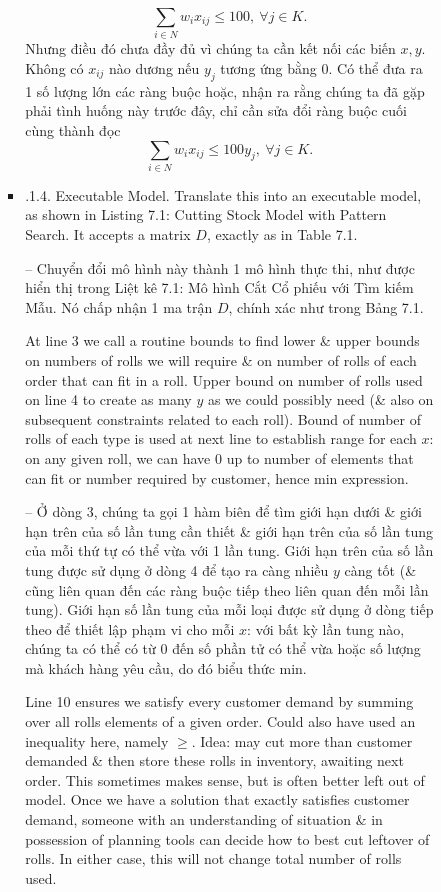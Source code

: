 \documentclass{article}
\begin{document}
\begin{itemize}
\begin{itemize}
\begin{itemize}
\begin{itemize}
\begin{equation*}
                    \sum_{i\in N} w_ix_{ij}\le100,\ \forall j\in K.
                \end{equation*}
                Nhưng điều đó chưa đầy đủ vì chúng ta cần kết nối các biến $x,y$. Không có $x_{ij}$ nào dương nếu $y_j$ tương ứng bằng 0. Có thể đưa ra 1 số lượng lớn các ràng buộc hoặc, nhận ra rằng chúng ta đã gặp phải tình huống này trước đây, chỉ cần sửa đổi ràng buộc cuối cùng thành đọc
                \begin{equation*}
                    \sum_{i\in N} w_ix_{ij}\le100y_j,\ \forall j\in K.
                \end{equation*}
                \item {.1.4. Executable Model.} Translate this into an executable model, as shown in {\sf Listing 7.1: Cutting Stock Model with Pattern Search}. It accepts a matrix $D$, exactly as in Table 7.1.

                -- Chuyển đổi mô hình này thành 1 mô hình thực thi, như được hiển thị trong {\sf Liệt kê 7.1: Mô hình Cắt Cổ phiếu với Tìm kiếm Mẫu}. Nó chấp nhận 1 ma trận $D$, chính xác như trong Bảng 7.1.

                At line 3 we call a routine bounds to find lower \& upper bounds on numbers of rolls we will require \& on number of rolls of each order that can fit in a roll. Upper bound on number of rolls used on line 4 to create as many $y$ as we could possibly need (\& also on subsequent constraints related to each roll). Bound of number of rolls of each type is used at next line to establish range for each $x$: on any given roll, we can have 0 up to number of elements that can fit or number required by customer, hence min expression.

                -- Ở dòng 3, chúng ta gọi 1 hàm biên để tìm giới hạn dưới \& giới hạn trên của số lần tung cần thiết \& giới hạn trên của số lần tung của mỗi thứ tự có thể vừa với 1 lần tung. Giới hạn trên của số lần tung được sử dụng ở dòng 4 để tạo ra càng nhiều $y$ càng tốt (\& cũng liên quan đến các ràng buộc tiếp theo liên quan đến mỗi lần tung). Giới hạn số lần tung của mỗi loại được sử dụng ở dòng tiếp theo để thiết lập phạm vi cho mỗi $x$: với bất kỳ lần tung nào, chúng ta có thể có từ 0 đến số phần tử có thể vừa hoặc số lượng mà khách hàng yêu cầu, do đó biểu thức min.

                Line 10 ensures we satisfy every customer demand by summing over all rolls elements of a given order. Could also have used an inequality here, namely $\ge$. Idea: may cut more than customer demanded \& then store these rolls in inventory, awaiting next order. This sometimes makes sense, but is often better left out of model. Once we have a solution that exactly satisfies customer demand, someone with an understanding of situation \& in possession of planning tools can decide how to best cut leftover of rolls. In either case, this will not change total number of rolls used.


\end{itemize}
\end{itemize}
\end{itemize}
\end{itemize}
\end{document}
